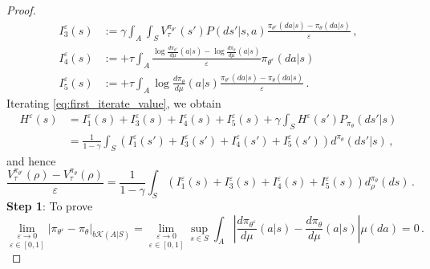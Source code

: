 \documentclass{amsart}
\theoremstyle{definition}
\begin{document}
\begin{proof}
\begin{align*}
I^{\varepsilon}_3(s)&:=\gamma\int_{A}\int_{S}V^{\pi_{\theta^{\varepsilon}}}_{\tau}(s')P(ds'|s,a)\frac{\pi_{\theta^{\varepsilon}}(da|s)-\pi_{\theta}(da|s)}{\varepsilon}\,,\\
I^{\varepsilon}_4(s)&:=+\tau \int_{A}\frac{\log\frac{d\pi_{\theta^{\varepsilon}}}{d\mu}(a|s) -\log\frac{d\pi_{\theta}}{d\mu}(a|s) }{\varepsilon}\pi_{\theta^{\varepsilon}}(da|s)\,\\
I^{\varepsilon}_5(s)&:=+\tau\int_{A}\log\frac{d\pi_{\theta}}{d\mu}(a|s)\frac{\pi_{\theta^{\varepsilon}}(da|s)-\pi_{\theta}(da|s)}{\varepsilon}\,. 
\end{align*}
Iterating \eqref{eq:first_iterate_value}, we obtain
\begin{align*}
H^{\varepsilon}(s) &= I^{\varepsilon}_1(s) + I^{\varepsilon}_3(s)+I^{\varepsilon}_4(s)+I^{\varepsilon}_5(s) +\gamma  \int_{S}H^{\varepsilon}(s')P_{\pi_{\theta}}(ds'|s)\\
&=\frac{1}{1-\gamma} \int_{S} (I^{\varepsilon}_1(s')+I^{\varepsilon}_3(s')+I^{\varepsilon}_4(s')+I^{\varepsilon}_5(s'))d^{\pi_{\theta}}(ds'|s)\,,
\end{align*}
and hence
\[
\frac{V_\tau^{\pi_{\theta^\epsilon}}(\rho) - V_\tau^{\pi_\theta}(\rho)}{\varepsilon} =\frac{1}{1-\gamma} \int_{S} (I^{\varepsilon}_1(s)+I^{\varepsilon}_3(s)+I^{\varepsilon}_4(s)+I^{\varepsilon}_5(s))d^{\pi_{\theta}}_{\rho}(ds)\,.
\]
\textbf{Step 1}: To prove \begin{equation}\label{eq:limit_policy}
\underset{\varepsilon \in [0,1]}{\lim_{\varepsilon\rightarrow 0}}|\pi_{\theta^{\varepsilon}}-\pi_{\theta}|_{b\mathcal{K}(A|S)}=\underset{\varepsilon \in [0,1]}{\lim_{\varepsilon\rightarrow 0}}\sup_{s\in S}\int_{A}\left|\frac{d\pi_{\theta^{\varepsilon}}}{d\mu}(a|s)-\frac{d\pi_{\theta}}{d\mu}(a|s)\right|\mu(da)=0\,.
\end{equation}


\end{proof}
\end{document}
